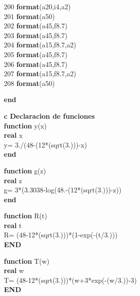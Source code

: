 \documentclass{article}
\begin{document}
200 \textbf{format}(a20,i4,a2)\\
201 \textbf{format}(a50)\\
202 \textbf{format}(a45,f8.7)\\
203 \textbf{format}(a45,f8.7)\\
204 \textbf{format}(a15,f8.7,a2)\\
205 \textbf{format}(a45,f8.7)\\
206 \textbf{format}(a45,f8.7)\\
207 \textbf{format}(a15,f8.7,a2)\\
208 \textbf{format}(a50)

 \textbf{end }

\textbf{c Declaracion de funciones \\
function }y(x) \\
\textbf{real }x \\
y= 3./(48-(12*(sqrt(3.)))-x) \\
\textbf{end }

  \textbf{function }g(z) \\
\textbf{real }z \\
g= 3*(3.3038-log(48.-(12*(sqrt(3.)))-z)) \\
\textbf{end }

 \textbf{function }R(t) \\
\textbf{real }t \\
R= (48-12*(sqrt(3.)))*(1-exp(-(t/3.))) \\
\textbf{END }

 \textbf{function }T(w) \\
\textbf{real }w \\
T= (48-12*(sqrt(3.)))*(w+3*exp(-(w/3.))-3) \\
\textbf{END }
\end{document}
